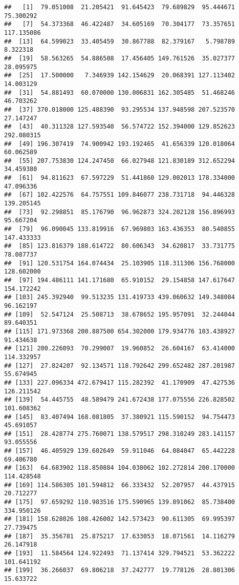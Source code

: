 \documentclass[
]{article}
\begin{document}
\begin{verbatim}
##   [1]  79.051008  21.205421  91.645423  79.689829  95.444671  75.300292
##   [7]  54.373368  46.422487  34.605169  70.304177  73.357651 117.135086
##  [13]  64.599023  33.405459  30.867788  82.379167   5.798789   8.322318
##  [19]  58.563265  54.886508  17.456405 149.761526  35.027377  28.095975
##  [25]  17.500000   7.346939 142.154629  20.068391 127.113402  14.003129
##  [31]  54.881493  60.070000 130.006831 162.305485  51.468246  46.703262
##  [37] 370.018000 125.488390  93.295534 137.948598 207.523570  27.147247
##  [43]  40.311328 127.593540  56.574722 152.394000 129.852623 292.080315
##  [49] 196.307419  74.900942 193.192465  41.656339 120.018064  60.062589
##  [55] 207.753830 124.247450  66.027948 121.830189 312.652294  34.459380
##  [61]  94.811623  67.597229  51.441860 129.002013 178.334000  47.096336
##  [67] 102.422576  64.757551 109.846077 238.731718  94.446328 139.205145
##  [73]  92.298851  85.176790  96.962873 324.202128 156.896993  95.667204
##  [79]  96.090045 133.819916  67.969803 163.436353  80.540855 147.433333
##  [85] 123.816379 188.614722  80.606343  34.620817  33.731775  78.087737
##  [91] 120.531754 164.074434  25.103905 118.311306 156.768000 128.602000
##  [97] 194.486111 141.171680  65.910152  29.154858 147.617647 154.172242
## [103] 245.392940  99.513235 131.419733 439.060632 149.348084  96.162197
## [109]  52.547124  25.508713  38.678652 195.957091  32.244044  89.640351
## [115] 171.973368 200.887500 654.302000 179.934776 103.438927  91.434638
## [121] 200.226093  70.299007  19.960852  26.604167  63.414000 114.332957
## [127]  27.824207  92.134571 118.792642 299.652482 287.201987  55.674945
## [133] 227.096334 472.679417 115.282392  41.170909  47.427536 126.211542
## [139]  54.445755  48.589479 241.672438 177.075556 226.828502 101.608362
## [145]  83.407494 168.081805  37.380921 115.590152  94.754473  45.691057
## [151]  28.428774 275.760071 138.579517 298.310249 283.141157  93.055556
## [157]  46.405929 139.602649  59.911046  64.084047  65.442228  69.406780
## [163]  64.683902 118.850884 104.038062 102.272814 200.170000 114.428548
## [169] 114.586305 101.594812  66.333432  52.207957  44.437915  20.712277
## [175]  97.659292 110.983516 175.590965 139.891062  85.738400 334.950126
## [181] 158.628026 108.426002 142.573423  90.611305  69.995397  27.739475
## [187]  35.356781  25.875217  17.633053  18.071561  14.116279  26.147918
## [193]  11.584564 124.922493  71.137414 329.794521  53.362222 101.641192
## [199]  36.266037  69.806218  37.242777  19.778126  28.801306  15.633722

\end{verbatim}
\end{document}
